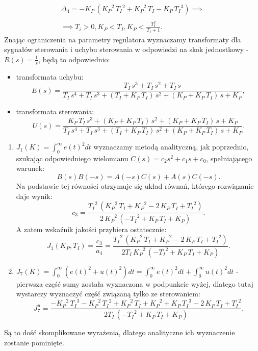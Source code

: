 \documentclass{article}
\begin{document}
\begin{enumerate}[(a)]
$$\begin{array}{c}
                \Delta_{4} = -K_{P}\,\left({K_{P}}^2\,{T_{I}}^2+{K_{P}}^2\,T_{I}-K_{P}\,{T_{I}}^3\right)
                \implies\\
                \\
                \implies
                T_{i} > 0, K_P < T_I, K_P < \frac{T_I^2}{T_I + 1}.
                \end{array}
        $$
        Znając ograniczenia na parametry regulatora wyznaczamy transformaty dla sygnałów sterowania i uchybu sterowania w odpowiedzi na skok jednostkowy - $R(s) = \frac{1}{s}$, będą to odpowiednio:
        \begin{itemize}
            \item transformata uchybu:
            $$
                E(s)
                =
                \frac{T_{I}\,s^3+T_{I}\,s^2+T_{I}\,s}{T_{I}\,s^4+T_{I}\,s^3+\left(T_{I}+K_{P}\,T_{I}\right)\,s^2+\left(K_{P}+K_{P}\,T_{I}\right)\,s+K_{P}},
            $$
            \item transformata sterowania:
            $$
                U(s)
                =
                \frac{K_{P}\,T_{I}\,s^3+\left(K_{P}+K_{P}\,T_{I}\right)\,s^2+\left(K_{P}+K_{P}\,T_{I}\right)\,s+K_{P}}{T_{I}\,s^4+T_{I}\,s^3+\left(T_{I}+K_{P}\,T_{I}\right)\,s^2+\left(K_{P}+K_{P}\,T_{I}\right)\,s+K_{P}}.
            $$
        \end{itemize}

        \begin{enumerate}[label=(\arabic*.)]
            \item $J_{1}(K) = \int_{0}^{\infty}{e(t)^2dt}$ wyznaczamy metodą analityczną, jak poprzednio, szukając odpowiedniego wielomianu $C(s) = c_{2}s^2 + c_{1}s + c_{0}$, spełniającego warunek:
            $$
                B(s)B(-s) = A(-s)C(s) + A(s)C(-s).
            $$
            Na podstawie tej równości otrzymuje się układ równań, którego rozwiązanie daje wynik:
            $$
                c_{3} = \frac{{T_{I}}^2\,\left({K_{P}}^2\,T_{I}+{K_{P}}^2-2\,K_{P}\,T_{I}+{T_{I}}^2\right)}{2\,{K_{P}}^2\,\left(-{T_{I}}^2+K_{P}\,T_{I}+K_{P}\right)}.
            $$
            A zatem wskaźnik jakości przybiera ostatecznie:
            $$
                J_{1}(K_P, T_I) = \frac{c_3}{a_{4}} = \frac{{T_{I}}^2\,\left({K_{P}}^2\,T_{I}+{K_{P}}^2-2\,K_{P}\,T_{I}+{T_{I}}^2\right)}{2T_{I}\,{K_{P}}^2\,\left(-{T_{I}}^2+K_{P}\,T_{I}+K_{P}\right)}.
            $$

            \item $J_{7}(K) = \int_{0}^{\infty}{\left( e(t)^2 + u(t)^2 \right)dt} = \int_{0}^{\infty}{e(t)^2dt} + \int_{0}^{\infty}{u(t)^2dt}$ - pierwsza część sumy została wyznaczona w podpunkcie wyżej, dlatego tutaj wystarczy wyznaczyć część związaną tylko ze sterowaniem:
            $$
                J_{7}^{u} = \frac{-{K_{P}}^2\,{T_{I}}^3-{K_{P}}^2\,{T_{I}}^2+{K_{P}}^2\,T_{I}+{K_{P}}^2+K_{P}\,{T_{I}}^3-2\,K_{P}\,T_{I}+{T_{I}}^2}{2T_I\,\left(-{T_{I}}^2+K_{P}\,T_{I}+K_{P}\right)}.
            $$
        \end{enumerate}
        Są to dość skomplikowane wyrażenia, dlatego analityczne ich wyznaczenie zostanie pominięte.
    \end{enumerate} 
    
\end{document}
